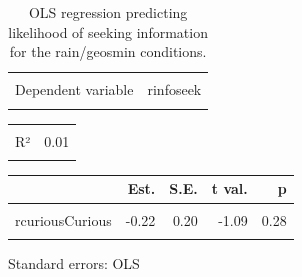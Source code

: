 \documentclass[
  letterpaper,
  DIV=11,
  numbers=noendperiod]{scrartcl}
\begin{document}
\hypertarget{tbl-rinfoseek}{}
\begin{table}[!h]
\caption{\label{tbl-rinfoseek}OLS regression predicting likelihood of seeking information for the
rain/geosmin conditions. }\tabularnewline

\centering
\begin{tabular}{lr}
\toprule
\cellcolor{gray!10}{Observations} & \cellcolor{gray!10}{237}\\
Dependent variable & rinfoseek\\
\cellcolor{gray!10}{Type} & \cellcolor{gray!10}{OLS linear regression}\\
\bottomrule
\end{tabular}
\end{table} \begin{table}[!h]
\centering
\begin{tabular}{lr}
\toprule
\cellcolor{gray!10}{F(2,234)} & \cellcolor{gray!10}{0.73}\\
R² & 0.01\\
\cellcolor{gray!10}{Adj. R²} & \cellcolor{gray!10}{-0.00}\\
\bottomrule
\end{tabular}
\end{table} \begin{table}[!h]
\centering
\begin{threeparttable}
\begin{tabular}{lrrrr}
\toprule
  & Est. & S.E. & t val. & p\\
\midrule
\cellcolor{gray!10}{(Intercept)} & \cellcolor{gray!10}{3.42} & \cellcolor{gray!10}{0.17} & \cellcolor{gray!10}{20.01} & \cellcolor{gray!10}{0.00}\\
rcuriousCurious & -0.22 & 0.20 & -1.09 & 0.28\\
\cellcolor{gray!10}{rresoResolution} & \cellcolor{gray!10}{-0.10} & \cellcolor{gray!10}{0.20} & \cellcolor{gray!10}{-0.48} & \cellcolor{gray!10}{0.63}\\
\bottomrule
\end{tabular}
\begin{tablenotes}
\item Standard errors: OLS
\end{tablenotes}
\end{threeparttable}
\end{table}
\end{document}
